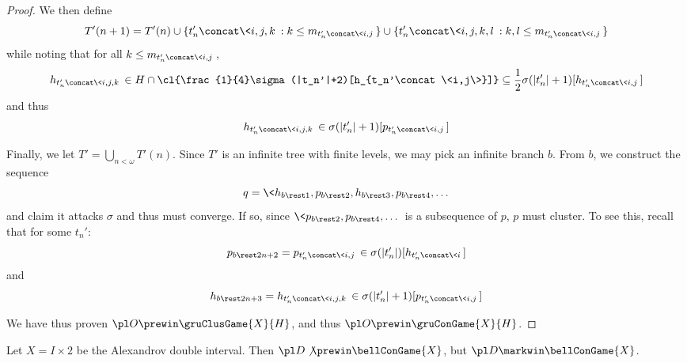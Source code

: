 \begin{proof}
  We then define
  \[
    T'(n+1)
      =
    T'(n)
      \cup
    \{t_n'\concat\<i,j,k\>: k\leq m_{t_n'\concat\<i,j\>}\}
      \cup
    \{t_n'\concat\<i,j,k,l\>: k,l\leq m_{t_n'\concat\<i,j\>}\}
  \]
  while noting that for all $k\leq m_{t_n'\concat\<i,j\>}$,
  \[
    h_{t_n'\concat\<i,j,k\>}
      \in
    H\cap \cl{\frac{1}{4}\sigma(|t_n'|+2)[h_{t_n'\concat\<i,j\>}]}
      \subseteq
    \frac{1}{2}\sigma(|t_n'|+1)[h_{t_n'\concat\<i,j\>}]
  \]
  and thus
  \[
    h_{t_n'\concat\<i,j,k\>}\in\sigma(|t_n'|+1)[p_{t_n'\concat\<i,j\>}]
  \]

  Finally, we let $T'=\bigcup_{n<\omega}T'(n)$. Since
  $T'$ is an infinite tree with finite levels, we may
  pick an infinite branch $b$. From $b$, we construct the sequence
  \[
    q=\<h_{b\rest 1}, p_{b\rest 2}, h_{b\rest 3}, p_{b\rest 4}, \dots\>
  \]
  and claim it attacks $\sigma$ and thus must converge. If so, since
  $\<p_{b\rest2},p_{b\rest4},\dots\>$ is a subsequence of $p$, $p$ must
  cluster. To see this, recall that for some $t_n'$:
  \[
    p_{b\rest2n+2}
      =
    p_{t_n'\concat\<i,j\>}
      \in
    \sigma(|t_n'|)[h_{t_n'\concat\<i\>}]
  \]
  and
  \[
    h_{b\rest2n+3}
      =
    h_{t_n'\concat\<i,j,k\>}
      \in
    \sigma(|t_n'|+1)[p_{t_n'\concat\<i,j\>}]
  \]

  We have thus proven $\pl O\prewin\gruClusGame{X}{H}$, and thus
  $\pl O\prewin\gruConGame{X}{H}$.
\end{proof}











\newpage

\begin{ex}
  Let $X=I\times 2$ be the Alexandrov double interval. Then
  $\pl D \not\prewin \bellConGame{X}$, but $\pl D \markwin \bellConGame{X}$.
\end{ex}

